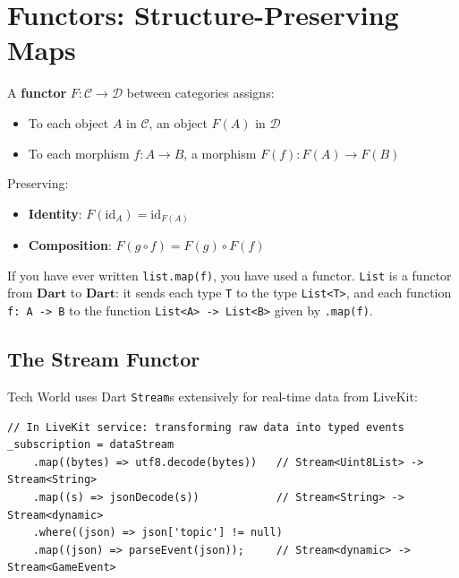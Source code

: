 \documentclass[12pt,a4paper]{article}
\theoremstyle{definition}
\theoremstyle{plain}
\theoremstyle{remark}
\begin{document}
\section{Functors: Structure-Preserving Maps}
\label{sec:functors}

\begin{formal}
A \textbf{functor} $F \colon \mathcal{C} \to \mathcal{D}$ between categories
assigns:
\begin{itemize}
  \item To each object $A$ in $\mathcal{C}$, an object $F(A)$ in $\mathcal{D}$
  \item To each morphism $f \colon A \to B$, a morphism
        $F(f) \colon F(A) \to F(B)$
\end{itemize}
Preserving:
\begin{itemize}
  \item \textbf{Identity}: $F(\mathrm{id}_A) = \mathrm{id}_{F(A)}$
  \item \textbf{Composition}: $F(g \circ f) = F(g) \circ F(f)$
\end{itemize}
\end{formal}

\begin{youknow}
If you have ever written \texttt{list.map(f)}, you have used a functor.
\texttt{List} is a functor from $\mathbf{Dart}$ to $\mathbf{Dart}$:
it sends each type \texttt{T} to the type \texttt{List<T>},
and each function \texttt{f: A -> B} to the function
\texttt{List<A> -> List<B>} given by \texttt{.map(f)}.
\end{youknow}

\subsection{The Stream Functor}

Tech World uses Dart \texttt{Stream}s extensively for real-time data from LiveKit:

\begin{lstlisting}
// In LiveKit service: transforming raw data into typed events
_subscription = dataStream
    .map((bytes) => utf8.decode(bytes))   // Stream<Uint8List> -> Stream<String>
    .map((s) => jsonDecode(s))            // Stream<String> -> Stream<dynamic>
    .where((json) => json['topic'] != null)
    .map((json) => parseEvent(json));     // Stream<dynamic> -> Stream<GameEvent>
\end{lstlisting}
\end{document}
